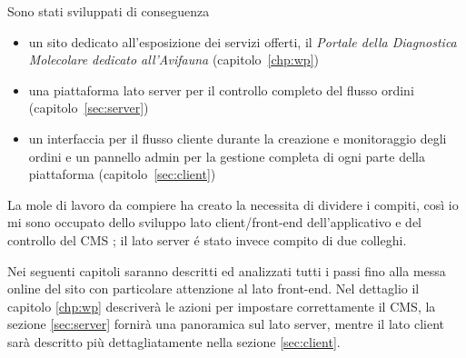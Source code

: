 Sono stati sviluppati di conseguenza
\begin{itemize}
\item un sito dedicato all'esposizione dei servizi offerti, il \emph{Portale della Diagnostica Molecolare dedicato all'Avifauna} (capitolo~\ref{chp:wp})
\item una piattaforma lato server per il controllo completo del flusso ordini (capitolo~\ref{sec:server})
\item un interfaccia per il flusso cliente durante la creazione e monitoraggio degli ordini e un pannello admin per la gestione completa di ogni parte della piattaforma (capitolo~\ref{sec:client})
\end{itemize}

La mole di lavoro da compiere ha creato la necessita di dividere i compiti, così io mi sono occupato dello sviluppo lato client/front-end dell'applicativo e del controllo del CMS {\wp}; il lato server é stato invece compito di due colleghi.

Nei seguenti capitoli saranno descritti ed analizzati tutti i passi fino alla messa online del sito con particolare attenzione al lato front-end. Nel dettaglio il capitolo \ref{chp:wp} descriverà le azioni per impostare correttamente il CMS, la sezione \ref{sec:server} fornirà una panoramica sul lato server, mentre il lato client sarà descritto più dettagliatamente nella sezione \ref{sec:client}.
